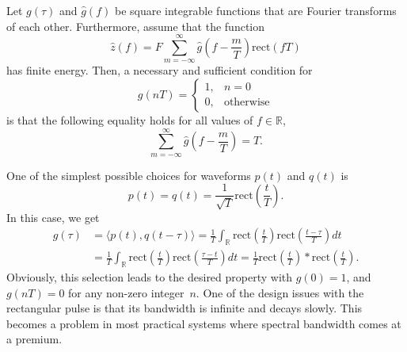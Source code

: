 \begin{theorem}[Nyquist] \label{theorem:NyquistPulseCriterion}
Let $g(\tau)$ and $\hat{g}(f)$ be square integrable functions that are Fourier transforms of each other.
Furthermore, assume that the function
\begin{equation*}
\hat{z} (f) = F \sum_{m=-\infty}^{\infty} \hat{g} \left( f - \frac{m}{T} \right)
\mathrm{rect} (fT)
\end{equation*}
has finite energy.
Then, a necessary and sufficient condition for
\begin{equation*}
g(nT) = \begin{cases} 1, & n = 0 \\
0, & \text{otherwise} \end{cases}
\end{equation*}
is that the following equality holds for all values of $f \in \mathbb{R}$,
\begin{equation} \label{equation:NyquistCriterionFrequencyCondition}
\sum_{m=-\infty}^{\infty} \hat{g} \left( f - \frac{m}{T} \right) = T .
\end{equation}
\end{theorem}

\begin{example}
One of the simplest possible choices for waveforms $p(t)$ and $q(t)$ is
\begin{equation*}
p(t) = q(t) = \frac{1}{\sqrt{T}} \mathrm{rect} \left( \frac{t}{T} \right) .
\end{equation*}
In this case, we get
\begin{equation*}
\begin{split}
g(\tau) &= \langle p(t), q(t-\tau) \rangle
= \frac{1}{T} \int_{\mathbb{R}} \mathrm{rect} \left( \frac{t}{T} \right)
\mathrm{rect} \left( \frac{t - \tau}{T} \right) dt \\
&= \frac{1}{T} \int_{\mathbb{R}} \mathrm{rect} \left( \frac{t}{T} \right)
\mathrm{rect} \left( \frac{\tau - t}{T} \right) dt
= \frac{1}{T} \mathrm{rect} \left( \frac{t}{T} \right)
\ast \mathrm{rect}\left( \frac{t}{T} \right) .
\end{split}
\end{equation*}
Obviously, this selection leads to the desired property with $g(0) = 1$, and $g(nT) = 0$ for any non-zero integer~$n$.
One of the design issues with the rectangular pulse is that its bandwidth is infinite and decays slowly.
This becomes a problem in most practical systems where spectral bandwidth comes at a premium.
\end{example}


